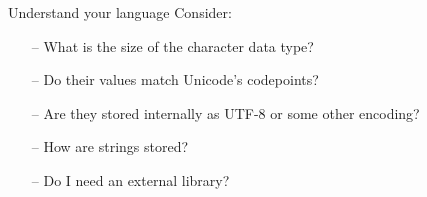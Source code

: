 \documentclass[../index.tex]{subfiles}
\begin{document}
\renewcommand{\currenttitle}{Understand your language}
\begin{frame}{\currenttitle}
%
%
%
%
%
  Consider:

  \begin{itemize}
    \item[--] What is the size of the character data type?
    \item[--] Do their values match Unicode's codepoints?
    \item[--] Are they stored internally as UTF-8 or some other encoding?
    \item[--] How are strings stored?
    \item[--] Do I need an external library?
  \end{itemize}
\end{frame}
\end{document}
